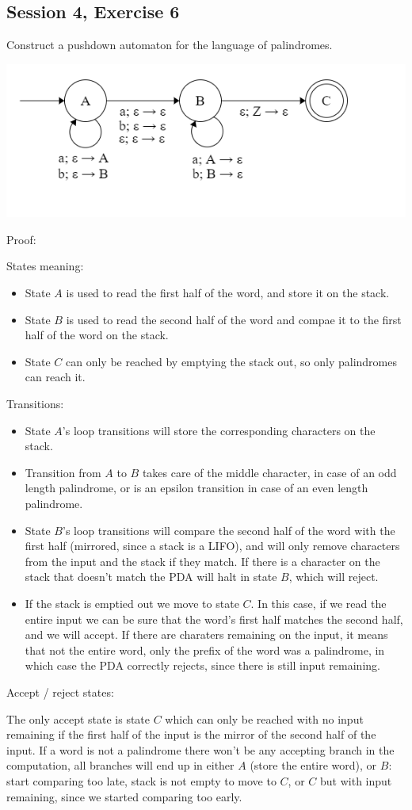 \subsection{Session 4, Exercise 6}
\label{4_6}


Construct a pushdown automaton for the language of palindromes.


\includegraphics[width=0.5\linewidth]{04/4_6.png}

Proof:

States meaning:
\begin{itemize}
    \item State $A$ is used to read the first half of the word, and store it on the stack.
    \item State $B$ is used to read the second half of the word and compae it to the first half of the word on the stack.
    \item State $C$ can only be reached by emptying the stack out, so only palindromes can reach it.
\end{itemize}

Transitions:

\begin{itemize}
    \item State $A$'s loop transitions will store the corresponding characters on the stack.
    \item Transition from $A$ to $B$ takes care of the middle character, in case of an odd length palindrome, or is an epsilon transition in case of an even length palindrome.
    \item State $B$'s loop transitions will compare the second half of the word with the first half (mirrored, since a stack is a LIFO), and will only remove characters from the input and the stack if they match. If there is a character on the stack that doesn't match the PDA will halt in state $B$, which will reject.
    \item If the stack is emptied out we move to state $C$. In this case, if we read the entire input we can be sure that the word's first half matches the second half, and we will accept. If there are charaters remaining on the input, it means that not the entire word, only the prefix of the word was a palindrome, in which case the PDA correctly rejects, since there is still input remaining.
\end{itemize}

Accept / reject states:

The only accept state is state $C$ which can only be reached with no input remaining if the first half of the input is the mirror of the second half of the input. If a word is not a palindrome there won't be any accepting branch in the computation, all branches will end up in either $A$ (store the entire word), or $B$: start comparing too late, stack is not empty to move to $C$, or $C$ but with input remaining, since we started comparing too early.